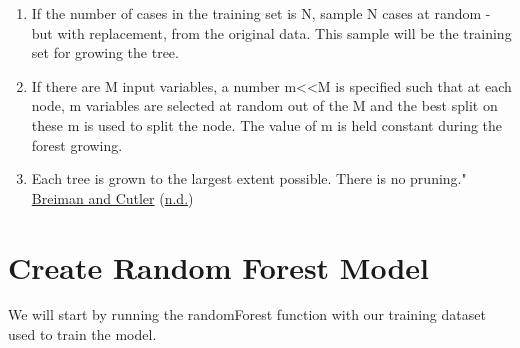 \documentclass[
]{book}
\newenvironment{Shaded}{\begin{snugshade}}{\end{snugshade}}
\newcommand{\AttributeTok}[1]{\textcolor[rgb]{0.77,0.63,0.00}{#1}}
\newcommand{\CommentTok}[1]{\textcolor[rgb]{0.56,0.35,0.01}{\textit{#1}}}
\newcommand{\DecValTok}[1]{\textcolor[rgb]{0.00,0.00,0.81}{#1}}
\newcommand{\FunctionTok}[1]{\textcolor[rgb]{0.00,0.00,0.00}{#1}}
\newcommand{\NormalTok}[1]{#1}
\newcommand{\OtherTok}[1]{\textcolor[rgb]{0.56,0.35,0.01}{#1}}
\newcommand{\SpecialCharTok}[1]{\textcolor[rgb]{0.00,0.00,0.00}{#1}}
\providecommand{\tightlist}{%
  \setlength{\itemsep}{0pt}\setlength{\parskip}{0pt}}
\begin{document}
\begin{enumerate}
\def\labelenumi{\arabic{enumi}.}
\tightlist
\item
  If the number of cases in the training set is N, sample N cases at random - but with replacement, from the original data. This sample will be the training set for growing the tree.
\item
  If there are M input variables, a number m\textless\textless M is specified such that at each node, m variables are selected at random out of the M and the best split on these m is used to split the node. The value of m is held constant during the forest growing.
\item
  Each tree is grown to the largest extent possible. There is no pruning." \protect\hyperlink{ref-random_forests}{Breiman and Cutler} (\protect\hyperlink{ref-random_forests}{n.d.})
\end{enumerate}

\hypertarget{create-random-forest-model}{%
\section{Create Random Forest Model}\label{create-random-forest-model}}

We will start by running the randomForest function with our training dataset used to train the model.

\begin{Shaded}
\end{Shaded}
\end{document}
